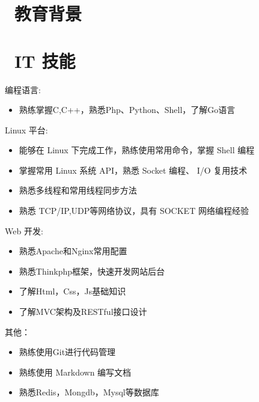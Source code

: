 \documentclass{resume}
\begin{document}


  
\leftline{\rule{18.46cm}{0.1mm}}


\section{\faGraduationCap\  教育背景}

\section{\faCogs\ IT 技能}
\begin{onehalfspacing}
编程语言:
\begin{itemize}
  \item 熟练掌握C,C++，熟悉Php、Python、Shell，了解Go语言
\end{itemize}
\end{onehalfspacing}
\begin{onehalfspacing}
Linux 平台:
\begin{itemize}[parsep=0.5ex]
  \item 能够在 Linux 下完成工作，熟练使用常用命令，掌握 Shell 编程
  \item 掌握常用 Linux 系统 API，熟悉 Socket 编程、 I/O 复用技术
  \item 熟悉多线程和常用线程同步方法
  \item 熟悉 TCP/IP,UDP等网络协议，具有 SOCKET 网络编程经验
\end{itemize}
\end{onehalfspacing}
\begin{onehalfspacing}
Web 开发:
\begin{itemize}[parsep=0.5ex]
\item 熟悉Apache和Nginx常用配置
\item 熟悉Thinkphp框架，快速开发网站后台
\item 了解Html，Css，Js基础知识
\item 了解MVC架构及RESTful接口设计
\end{itemize}
\end{onehalfspacing}
\begin{onehalfspacing}
其他：
\begin{itemize}[parsep=0.5ex]
\item 熟练使用Git进行代码管理
\item 熟练使用 Markdown 编写文档
\item 熟悉Redis，Mongdb，Mysql等数据库
\end{itemize}
\end{onehalfspacing}
\end{document}
